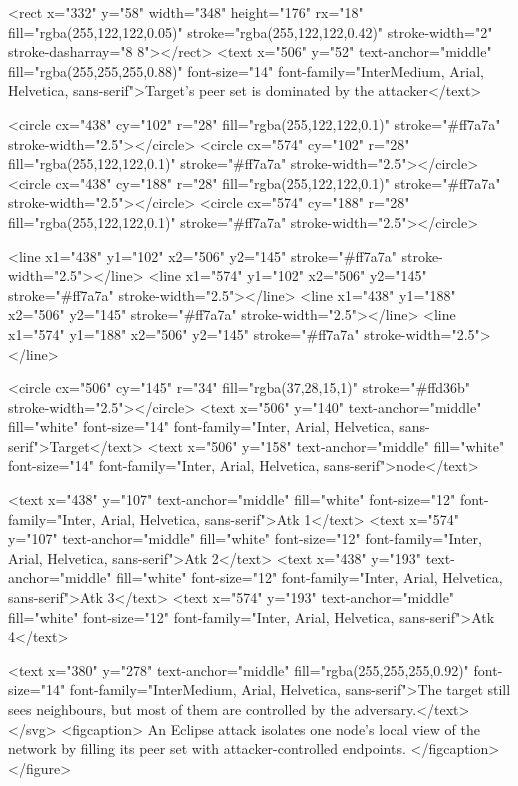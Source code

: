 \begin{rawhtml}
                <rect x="332" y="58" width="348" height="176" rx="18" fill="rgba(255,122,122,0.05)" stroke="rgba(255,122,122,0.42)" stroke-width="2" stroke-dasharray="8 8"></rect>
                <text x="506" y="52" text-anchor="middle" fill="rgba(255,255,255,0.88)" font-size="14" font-family="InterMedium, Arial, Helvetica, sans-serif">Target's peer set is dominated by the attacker</text>

                <circle cx="438" cy="102" r="28" fill="rgba(255,122,122,0.1)" stroke="#ff7a7a" stroke-width="2.5"></circle>
                <circle cx="574" cy="102" r="28" fill="rgba(255,122,122,0.1)" stroke="#ff7a7a" stroke-width="2.5"></circle>
                <circle cx="438" cy="188" r="28" fill="rgba(255,122,122,0.1)" stroke="#ff7a7a" stroke-width="2.5"></circle>
                <circle cx="574" cy="188" r="28" fill="rgba(255,122,122,0.1)" stroke="#ff7a7a" stroke-width="2.5"></circle>

                <line x1="438" y1="102" x2="506" y2="145" stroke="#ff7a7a" stroke-width="2.5"></line>
                <line x1="574" y1="102" x2="506" y2="145" stroke="#ff7a7a" stroke-width="2.5"></line>
                <line x1="438" y1="188" x2="506" y2="145" stroke="#ff7a7a" stroke-width="2.5"></line>
                <line x1="574" y1="188" x2="506" y2="145" stroke="#ff7a7a" stroke-width="2.5"></line>

                <circle cx="506" cy="145" r="34" fill="rgba(37,28,15,1)" stroke="#ffd36b" stroke-width="2.5"></circle>
                <text x="506" y="140" text-anchor="middle" fill="white" font-size="14" font-family="Inter, Arial, Helvetica, sans-serif">Target</text>
                <text x="506" y="158" text-anchor="middle" fill="white" font-size="14" font-family="Inter, Arial, Helvetica, sans-serif">node</text>

                <text x="438" y="107" text-anchor="middle" fill="white" font-size="12" font-family="Inter, Arial, Helvetica, sans-serif">Atk 1</text>
                <text x="574" y="107" text-anchor="middle" fill="white" font-size="12" font-family="Inter, Arial, Helvetica, sans-serif">Atk 2</text>
                <text x="438" y="193" text-anchor="middle" fill="white" font-size="12" font-family="Inter, Arial, Helvetica, sans-serif">Atk 3</text>
                <text x="574" y="193" text-anchor="middle" fill="white" font-size="12" font-family="Inter, Arial, Helvetica, sans-serif">Atk 4</text>

                <text x="380" y="278" text-anchor="middle" fill="rgba(255,255,255,0.92)" font-size="14" font-family="InterMedium, Arial, Helvetica, sans-serif">The target still sees neighbours, but most of them are controlled by the adversary.</text>
            </svg>
            <figcaption>
                An Eclipse attack isolates one node's local view of the network by filling its peer set with attacker-controlled endpoints.
            </figcaption>
        </figure>
\end{rawhtml}

